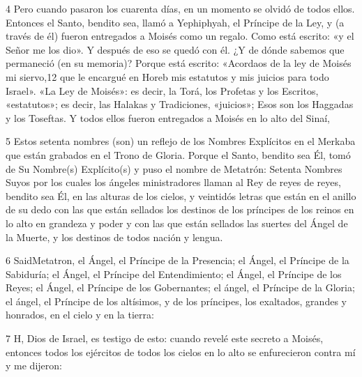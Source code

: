 \par 4 Pero cuando pasaron los cuarenta días, en un momento se olvidó de todos ellos. Entonces el Santo, bendito sea, llamó a Yephiphyah, el Príncipe de la Ley, y (a través de él) fueron entregados a Moisés como un regalo. Como está escrito: «y el Señor me los dio». Y después de eso se quedó con él. ¿Y de dónde sabemos que permaneció (en su memoria)? Porque está escrito: «Acordaos de la ley de Moisés mi siervo,12 que le encargué en Horeb mis estatutos y mis juicios para todo Israel». «La Ley de Moisés»: es decir, la Torá, los Profetas y los Escritos, «estatutos»; es decir, las Halakas y Tradiciones, «juicios»; Esos son los Haggadas y los Toseftas. Y todos ellos fueron entregados a Moisés en lo alto del Sinaí,

\par 5 Estos setenta nombres (son) un reflejo de los Nombres Explícitos en el Merkaba que están grabados en el Trono de Gloria. Porque el Santo, bendito sea Él, tomó de Su Nombre(s) Explícito(s) y puso el nombre de Metatrón: Setenta Nombres Suyos por los cuales los ángeles ministradores llaman al Rey de reyes de reyes, bendito sea Él, en las alturas de los cielos, y veintidós letras que están en el anillo de su dedo con las que están sellados los destinos de los príncipes de los reinos en lo alto en grandeza y poder y con las que están sellados las suertes del Ángel de la Muerte, y los destinos de todos nación y lengua.

\par 6 SaidMetatron, el Ángel, el Príncipe de la Presencia; el Ángel, el Príncipe de la Sabiduría; el Ángel, el Príncipe del Entendimiento; el Ángel, el Príncipe de los Reyes; el Ángel, el Príncipe de los Gobernantes; el ángel, el Príncipe de la Gloria; el ángel, el Príncipe de los altísimos, y de los príncipes, los exaltados, grandes y honrados, en el cielo y en la tierra:

\par 7 H, Dios de Israel, es testigo de esto: cuando revelé este secreto a Moisés, entonces todos los ejércitos de todos los cielos en lo alto se enfurecieron contra mí y me dijeron:


